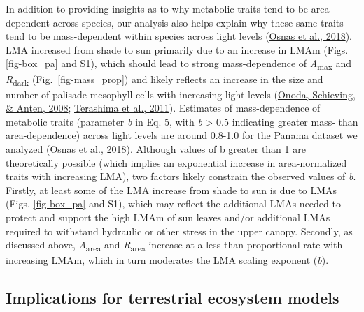 \documentclass[
  12pt,
  letterpaper,
  DIV=11,
  numbers=noendperiod]{scrartcl}
\begin{document}
In addition to providing insights as to why metabolic traits tend to be
area-dependent across species, our analysis also helps explain why these
same traits tend to be mass-dependent within species across light levels
(\protect\hyperlink{ref-Osnas2018}{Osnas et al., 2018}). LMA increased
from shade to sun primarily due to an increase in LMAm (Figs.
\ref{fig-box_pa} and S1), which should lead to strong mass-dependence of
\emph{A}\textsubscript{max} and \emph{R}\textsubscript{dark}
(Fig.~\ref{fig-mass_prop}) and likely reflects an increase in the size
and number of palisade mesophyll cells with increasing light levels
(\protect\hyperlink{ref-Onoda2008}{Onoda, Schieving, \& Anten, 2008};
\protect\hyperlink{ref-Terashima2011}{Terashima et al., 2011}).
Estimates of mass-dependence of metabolic traits (parameter \emph{b} in
Eq. 5, with \emph{b} \textgreater{} 0.5 indicating greater mass- than
area-dependence) across light levels are around 0.8-1.0 for the Panama
dataset we analyzed (\protect\hyperlink{ref-Osnas2018}{Osnas et al.,
2018}). Although values of b greater than 1 are theoretically possible
(which implies an exponential increase in area-normalized traits with
increasing LMA), two factors likely constrain the observed values of
\emph{b}. Firstly, at least some of the LMA increase from shade to sun
is due to LMAs (Figs. \ref{fig-box_pa} and S1), which may reflect the
additional LMAs needed to protect and support the high LMAm of sun
leaves and/or additional LMAs required to withstand hydraulic or other
stress in the upper canopy. Secondly, as discussed above,
\emph{A}\textsubscript{area} and \emph{R}\textsubscript{area} increase
at a less-than-proportional rate with increasing LMAm, which in turn
moderates the LMA scaling exponent (\emph{b}).

\hypertarget{implications-for-terrestrial-ecosystem-models}{%
\subsection{Implications for terrestrial ecosystem
models}\label{implications-for-terrestrial-ecosystem-models}}
\end{document}
